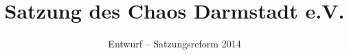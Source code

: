 \documentclass[ngerman]{article}
\begin{document}
\title{Satzung des Chaos Darmstadt e.V.}

\date{Entwurf -- Satzungsreform 2014}

\maketitle
\end{document}
